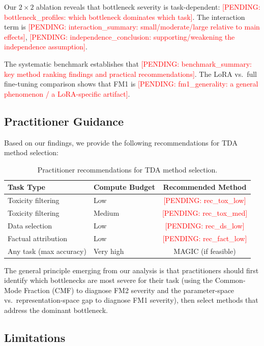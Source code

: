 \documentclass{article}
\newcommand{\pending}[1]{\textcolor{red}{[PENDING: #1]}}
\begin{document}
Our $2 \times 2$ ablation reveals that bottleneck severity is task-dependent: \pending{bottleneck\_profiles: which bottleneck dominates which task}. The interaction term is \pending{interaction\_summary: small/moderate/large relative to main effects}, \pending{independence\_conclusion: supporting/weakening the independence assumption}.

The systematic benchmark establishes that \pending{benchmark\_summary: key method ranking findings and practical recommendations}. The LoRA vs.\ full fine-tuning comparison shows that FM1 is \pending{fm1\_generality: a general phenomenon / a LoRA-specific artifact}.

\subsection{Practitioner Guidance}

Based on our findings, we provide the following recommendations for TDA method selection:

\begin{table}[t]
    \centering
    \caption{Practitioner recommendations for TDA method selection.}
    \label{tab:guidance}
    \small
    \begin{tabular}{llc}
        \toprule
        Task Type & Compute Budget & Recommended Method \\
        \midrule
        Toxicity filtering & Low & \pending{rec\_tox\_low} \\
        Toxicity filtering & Medium & \pending{rec\_tox\_med} \\
        Data selection & Low & \pending{rec\_ds\_low} \\
        Factual attribution & Low & \pending{rec\_fact\_low} \\
        Any task (max accuracy) & Very high & MAGIC (if feasible) \\
        \bottomrule
    \end{tabular}
\end{table}

The general principle emerging from our analysis is that practitioners should first identify which bottlenecks are most severe for their task (using the Common-Mode Fraction (CMF) to diagnose FM2 severity and the parameter-space vs.\ representation-space gap to diagnose FM1 severity), then select methods that address the dominant bottleneck.

\subsection{Limitations}
\end{document}
